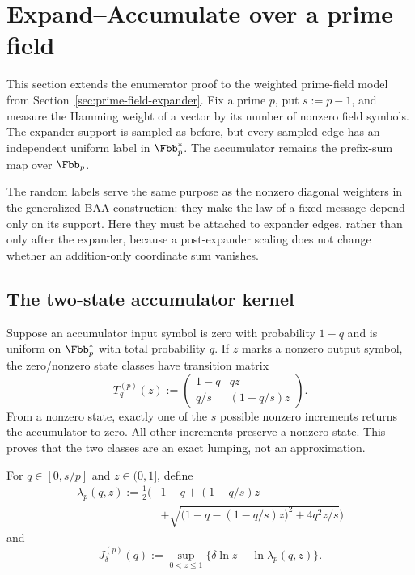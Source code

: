 \section{Expand--Accumulate over a prime field}
\label{sec:prime-field-ea}

This section extends the enumerator proof to the weighted prime-field model
from Section~\ref{sec:prime-field-expander}.  Fix a prime $p$, put $s:=p-1$,
and measure the Hamming weight of a vector by its number of nonzero field
symbols.  The expander support is sampled as before, but every sampled edge
has an independent uniform label in $\Fbb_p^*$.  The accumulator remains the
prefix-sum map over $\Fbb_p$.

The random labels serve the same purpose as the nonzero diagonal weighters in
the generalized BAA construction: they make the law of a fixed message depend
only on its support.  Here they must be attached to expander edges, rather than
only after the expander, because a post-expander scaling does not change
whether an addition-only coordinate sum vanishes.

\subsection{The two-state accumulator kernel}

Suppose an accumulator input symbol is zero with probability $1-q$ and is
uniform on $\Fbb_p^*$ with total probability $q$.  If $z$ marks a nonzero
output symbol, the zero/nonzero state classes have transition matrix
\begin{equation}
 T^{(p)}_q(z):=
 \begin{pmatrix}
  1-q&qz\\
  q/s&(1-q/s)z
 \end{pmatrix}.
 \label{eq:prime-ea-weight-matrix}
\end{equation}
From a nonzero state, exactly one of the $s$ possible nonzero increments
returns the accumulator to zero.  All other increments preserve a nonzero
state.  This proves that the two classes are an exact lumping, not an
approximation.

For $q\in[0,s/p]$ and $z\in(0,1]$, define
\begin{equation}
\begin{split}
 \lambda_p(q,z):=\frac12\bigg(&1-q+(1-q/s)z\\
 &+\sqrt{\bigl(1-q-(1-q/s)z\bigr)^2+4q^2z/s}\bigg)
\end{split}
\label{eq:prime-ea-spectral-radius}
\end{equation}
and
\begin{equation}
 J^{(p)}_\delta(q)
 :=\sup_{0<z\leq1}
   \{\delta\ln z-\ln\lambda_p(q,z)\}.
 \label{eq:prime-ea-tail-rate}
\end{equation}

